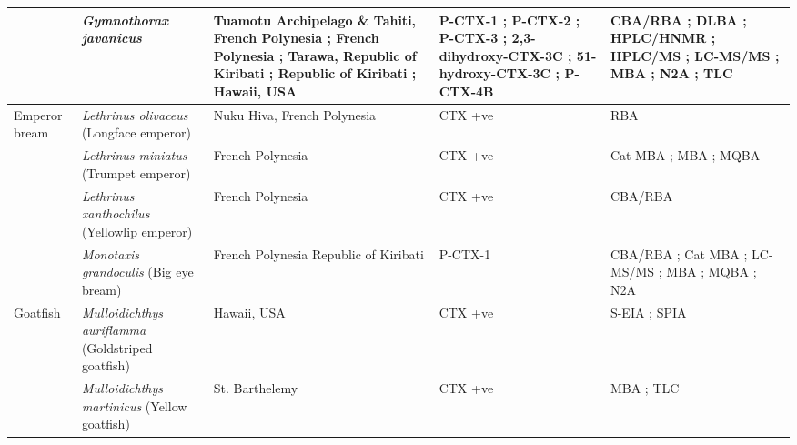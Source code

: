 \documentclass[12pt]{article}
\begin{document}
\begin{longtable}{ | p{2cm} | p{3cm} | p{4.5cm} | p{2cm} | p{3cm} | }
	& \emph{Gymnothorax javanicus} & Tuamotu Archipelago \& Tahiti, French Polynesia \cite{labrousse1996toxicological,murata1990structures,legrand1997two}; French Polynesia \cite{chinain2014mail}; Tarawa, Republic of Kiribati \cite{lewis1997characterization}; Republic of Kiribati \cite{mak2013pacific}; Hawaii, USA \cite{scheuer1967ciguatoxin} & P-CTX-1 \cite{murata1990structures,lewis1991purification,lewis1997characterization,mak2013pacific}; P-CTX-2 \cite{lewis1991purification,mak2013pacific}; P-CTX-3 \cite{mak2013pacific,lewis1991purification,lewis1997characterization}; 2,3-dihydroxy-CTX-3C \cite{satake1998isolation}; 51-hydroxy-CTX-3C \cite{satake1998isolation}; P-CTX-4B \cite{murata1990structures,lewis1991purification} & CBA/RBA \cite{chinain2014mail}; DLBA \cite{labrousse1996toxicological}; HPLC/HNMR \cite{murata1990structures,lewis1991purification}; HPLC/MS \cite{lewis1997characterization,satake1998isolation}; LC-MS/MS \cite{mak2013pacific}; MBA \cite{lewis1997characterization,scheuer1967ciguatoxin,satake1998isolation}; N2A \cite{mak2013pacific}; TLC \cite{scheuer1967ciguatoxin} \\
	\hline
	Emperor bream & \emph{Lethrinus olivaceus} (Longface emperor) & Nuku Hiva, French Polynesia \cite{darius2007ciguatera} & CTX +ve \cite{darius2007ciguatera} & RBA \cite{darius2007ciguatera} \\
	& \emph{Lethrinus miniatus} (Trumpet emperor) & French Polynesia \cite{bagnis1987use} & CTX +ve \cite{bagnis1987use} & Cat MBA \cite{bagnis1987use}; MBA \cite{bagnis1987use}; MQBA \cite{bagnis1987use} \\
	& \emph{Lethrinus xanthochilus} (Yellowlip emperor) & French Polynesia \cite{chinain2014mail} & CTX +ve \cite{chinain2014mail} & CBA/RBA \cite{chinain2014mail} \\
	& \emph{Monotaxis grandoculis} (Big eye bream) & French Polynesia \cite{bagnis1987use,chinain2014mail} Republic of Kiribati \cite{mak2013pacific} & P-CTX-1 \cite{mak2013pacific} & CBA/RBA \cite{chinain2014mail}; Cat MBA \cite{bagnis1987use}; LC-MS/MS \cite{mak2013pacific}; MBA \cite{bagnis1987use}; MQBA \cite{bagnis1987use}; N2A \cite{mak2013pacific}\\
	\hline
	Goatfish & \emph{Mulloidichthys auriflamma} (Goldstriped goatfish) & Hawaii, USA \cite{hokama1990simplified} & CTX +ve \cite{hokama1990simplified} & S-EIA \cite{hokama1990simplified}; SPIA \cite{hokama1990simplified} \\
	& \emph{Mulloidichthys martinicus} (Yellow goatfish) & St. Barthelemy \cite{vernoux1986heterogeneity} & CTX +ve \cite{vernoux1986heterogeneity} & MBA \cite{vernoux1986heterogeneity}; TLC \cite{vernoux1986heterogeneity} \\

\end{longtable}
\end{document}
